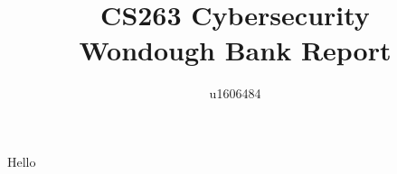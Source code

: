 \documentclass{article}
\title{
    CS263 Cybersecurity \\
    Wondough Bank Report
}
\author{u1606484}
\begin{document}
\maketitle





Hello
\end{document}
